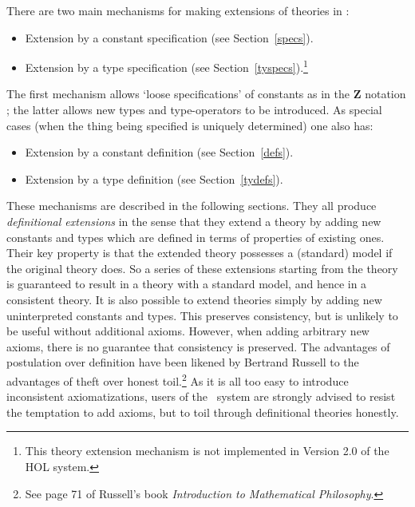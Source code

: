 There are two main mechanisms for making extensions of theories in \HOL:
\begin{itemize}

\item Extension by a constant specification   (see Section~\ref{specs}).

\item Extension by a type specification (see
Section~\ref{tyspecs}).\footnote{This theory extension mechanism is
not implemented in Version 2.0 of the HOL system.}

\end{itemize}
The first mechanism allows `loose specifications' of constants as in
the {\bf Z} notation \cite{Z}; the
latter allows new types and type-operators to be introduced.  As
special cases (when the thing being specified is uniquely determined)
one also has:
\begin{itemize}

\item Extension by a constant definition (see Section~\ref{defs}).

\item Extension by a type definition (see Section~\ref{tydefs}).

\end{itemize}
These mechanisms are described in the following sections. They all
produce {\it definitional extensions\/} in the sense that they extend
a theory by adding new constants and types which are defined in terms
of properties of existing ones. Their key property is that the
extended theory possesses a (standard) model if the original theory
does. So a series of these extensions starting from the theory
 is guaranteed to result in a theory with a standard
model, and hence in a consistent theory. It is also possible to extend
theories simply by adding new uninterpreted constants and types. This
preserves consistency, but is unlikely to be useful without additional
axioms. However, when adding arbitrary new
axioms, there is no guarantee
that consistency is preserved. The advantages of postulation over
definition have been likened by Bertrand Russell to the advantages of
theft over honest toil.\footnote{See page 71 of Russell's book {\sl
Introduction to Mathematical Philosophy\/}.} As it is all too easy to
introduce inconsistent axiomatizations, users of the \HOL\ system are
strongly advised to resist the temptation to add axioms, but to toil
through definitional theories honestly.





